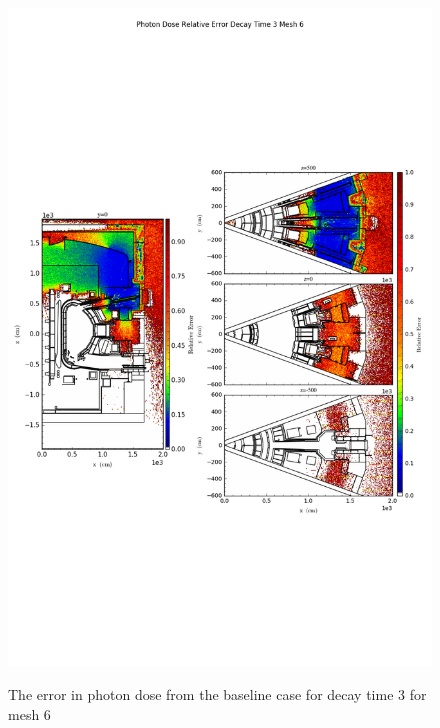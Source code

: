 \begin{figure}[ht!]
\centering
\includegraphics[trim={0cm 9cm 0cm 10cm},clip,scale=0.75]{../plots/final_model_nob4c/Photon_Dose_Relative_Error_Decay_Time_3_Mesh_6.png}
\label{fig:photons_dc3_no4bc_m6_error}
\caption{The error in photon dose from the baseline case for decay time 3 for mesh 6}
\end{figure}
